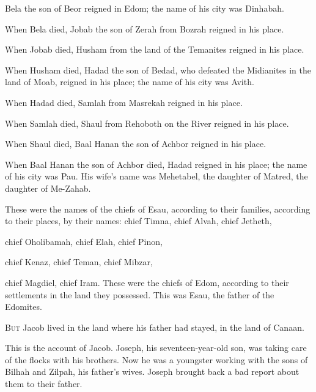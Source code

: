 \begin{scripture}
 Bela the son of Beor reigned in Edom; the name of his city was Dinhabah.
\everypar{}

 When Bela died, Jobab the son of Zerah from Bozrah reigned in his place.
\everypar{}

 When Jobab died, Husham from the land of the Temanites reigned in his place.
\everypar{}

 When Husham died, Hadad the son of Bedad, who defeated the Midianites in the land of Moab, reigned in his place; the name of his city was Avith.
\everypar{}

 When Hadad died, Samlah from Masrekah reigned in his place.
\everypar{}

 When Samlah died, Shaul from Rehoboth on the River reigned in his place.
\everypar{}

 When Shaul died, Baal Hanan the son of Achbor reigned in his place.
\everypar{}

 When Baal Hanan the son of Achbor died, Hadad reigned in his place; the name of his city was Pau. His wife's name was Mehetabel, the daughter of Matred, the daughter of Me-Zahab.
\everypar{}

 These were the names of the chiefs of Esau, according to their families, according to their places, by their names: chief Timna, chief Alvah, chief Jetheth,
 chief Oholibamah, chief Elah, chief Pinon,
 chief Kenaz, chief Teman, chief Mibzar,
 chief Magdiel, chief Iram. These were the chiefs of Edom, according to their settlements in the land they possessed. This was Esau, the father of the Edomites.

 \allowchapbreak\hypertarget{ch-genesis-37}{}\lettrine[lines=5]{\color{pentateuch}B}{\textsc{ut}} Jacob lived in the land where his father had stayed, in the land of Canaan.\everypar{}
\\\indent{} This is the account of Jacob. Joseph, his seventeen-year-old son, was taking care of the flocks with his brothers. Now he was a youngster working with the sons of Bilhah and Zilpah, his father's wives. Joseph brought back a bad report about them to their father.
\everypar{}


\end{scripture}
